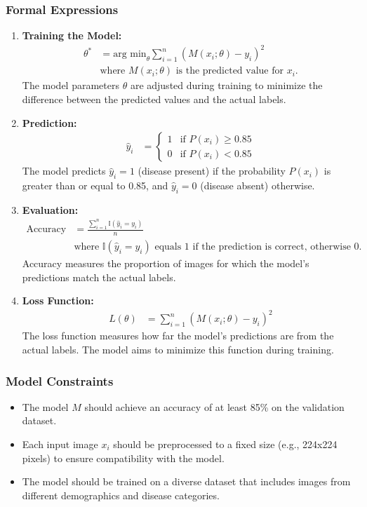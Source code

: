 \documentclass[12pt]{article}
\begin{document}
\subsubsection{Formal Expressions}
\begin{enumerate}
  \item \textbf{Training the Model:}
    \begin{align*}
      \theta^* &= \text{arg min}_\theta \sum_{i=1}^n (M(x_i; \theta) - y_i)^2 \\
      &\text{where } M(x_i; \theta) \text{ is the predicted value for } x_i.
    \end{align*}
    The model parameters \( \theta \) are adjusted during training to minimize the difference between the predicted values and the actual labels.

  \item \textbf{Prediction:}
    \begin{align*}
      \hat{y}_i &= \begin{cases}
        1 & \text{if } P(x_i) \geq 0.85 \\
        0 & \text{if } P(x_i) < 0.85
      \end{cases}
    \end{align*}
    The model predicts \( \hat{y}_i = 1 \) (disease present) if the probability \( P(x_i) \) is greater than or equal to 0.85, and \( \hat{y}_i = 0 \) (disease absent) otherwise.

  \item \textbf{Evaluation:}
    \begin{align*}
      \text{Accuracy} &= \frac{\sum_{i=1}^n \mathbb{I}(\hat{y}_i = y_i)}{n} \\
      &\text{where } \mathbb{I}(\hat{y}_i = y_i) \text{ equals 1 if the prediction is correct, otherwise 0.}
    \end{align*}
    Accuracy measures the proportion of images for which the model's predictions match the actual labels.

  \item \textbf{Loss Function:}
    \begin{align*}
      L(\theta) &= \sum_{i=1}^n (M(x_i; \theta) - y_i)^2
    \end{align*}
    The loss function measures how far the model's predictions are from the actual labels. The model aims to minimize this function during training.
\end{enumerate}

\subsubsection{Model Constraints}
\begin{itemize}
  \item The model \( M \) should achieve an accuracy of at least 85\% on the validation dataset.
  \item Each input image \( x_i \) should be preprocessed to a fixed size (e.g., 224x224 pixels) to ensure compatibility with the model.
  \item The model should be trained on a diverse dataset that includes images from different demographics and disease categories.
\end{itemize}
\end{document}
